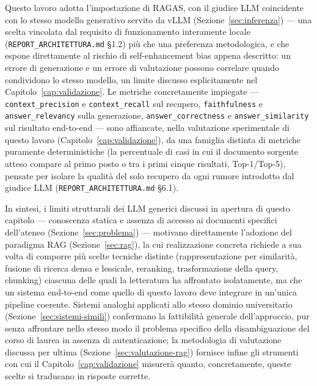 Questo lavoro adotta l'impostazione di RAGAS, con il giudice LLM coincidente con lo stesso modello generativo servito
da vLLM (Sezione~\ref{sec:inferenza}) --- una scelta vincolata dal requisito di funzionamento interamente locale
(\texttt{REPORT\_ARCHITETTURA.md} \S1.2) più che una preferenza metodologica, e che espone direttamente al rischio di
self-enhancement bias appena descritto: un errore di generazione e un errore di valutazione possono correlare quando
condividono lo stesso modello, un limite discusso esplicitamente nel Capitolo~\ref{cap:validazione}. Le metriche
concretamente impiegate --- \texttt{context\_precision} e \texttt{context\_recall} sul recupero,
\texttt{faithfulness} e \texttt{answer\_relevancy} sulla generazione, \texttt{answer\_correctness} e
\texttt{answer\_similarity} sul risultato end-to-end --- sono affiancate, nella valutazione sperimentale di questo
lavoro (Capitolo~\ref{cap:validazione}), da una famiglia distinta di metriche puramente deterministiche (la
percentuale di casi in cui il documento sorgente atteso compare al primo posto o tra i primi cinque risultati,
Top-1/Top-5), pensate per isolare la qualità del solo recupero da ogni rumore introdotto dal giudice LLM
(\texttt{REPORT\_ARCHITETTURA.md} \S6.1).

\bigskip

In sintesi, i limiti strutturali dei LLM generici discussi in apertura di questo capitolo --- conoscenza statica e
assenza di accesso ai documenti specifici dell'ateneo (Sezione~\ref{sec:problema}) --- motivano direttamente
l'adozione del paradigma RAG (Sezione~\ref{sec:rag}), la cui realizzazione concreta richiede a sua volta di comporre
più scelte tecniche distinte (rappresentazione per similarità, fusione di ricerca densa e lessicale, reranking,
trasformazione della query, chunking) ciascuna delle quali la letteratura ha affrontato isolatamente, ma che un
sistema end-to-end come quello di questo lavoro deve integrare in un'unica pipeline coerente. Sistemi analoghi
applicati allo stesso dominio universitario (Sezione~\ref{sec:sistemi-simili}) confermano la fattibilità generale
dell'approccio, pur senza affrontare nello stesso modo il problema specifico della disambiguazione del corso di
laurea in assenza di autenticazione; la metodologia di valutazione discussa per ultima (Sezione~\ref{sec:valutazione-rag})
fornisce infine gli strumenti con cui il Capitolo~\ref{cap:validazione} misurerà quanto, concretamente, queste scelte
si traducano in risposte corrette.

